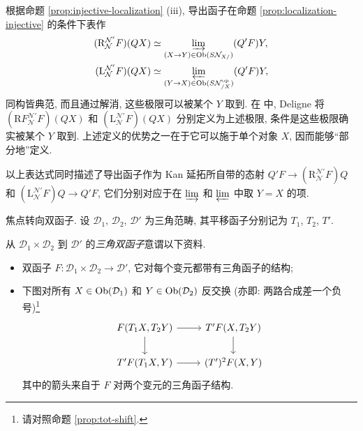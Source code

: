 \begin{remark}\label{rem:Deligne-derived-functor}
	根据命题 \ref{prop:injective-localization} (iii), 导出函子在命题 \ref{prop:localization-injective} 的条件下表作
	\begin{align*}
		(\mathrm{R}_{\mathcal{N}}^{\mathcal{N}'} F)(QX) & \simeq \varinjlim_{(X \to Y) \in \operatorname{Ob}(S\mathcal{N}_{X/})} (Q'F)Y, \\
		(\mathrm{L}_{\mathcal{N}}^{\mathcal{N}'} F)(QX) & \simeq \varprojlim_{(Y \to X) \in \operatorname{Ob}(S\mathcal{N}_{/X}^{\operatorname{op}})} (Q'F)Y,
	\end{align*}
	同构皆典范, 而且通过解消, 这些极限可以被某个 $Y$ 取到. 在 \cite[Exp XVII, Déf 1.2.1]{SGA4-3} 中, Deligne 将 $(\mathrm{R}F_{\mathcal{N}}^{\mathcal{N}'} F)(QX)$ 和 $(\mathrm{L}_{\mathcal{N}}^{\mathcal{N}'} F)(QX)$ 分别定义为上述极限, 条件是这些极限确实被某个 $Y$ 取到. 上述定义的优势之一在于它可以施于单个对象 $X$, 因而能够``部分地''定义.
	
	以上表达式同时描述了导出函子作为 Kan 延拓所自带的态射 $Q'F \to (\mathrm{R}^{\mathcal{N}'}_{\mathcal{N}} F)Q$ 和 $(\mathrm{L}^{\mathcal{N}'}_{\mathcal{N}} F)Q \to Q'F$, 它们分别对应于在 $\varinjlim$ 和 $\varprojlim$ 中取 $Y=X$ 的项.
\end{remark}

焦点转向双函子. 设 $\mathcal{D}_1$, $\mathcal{D}_2$, $\mathcal{D}'$ 为三角范畴, 其平移函子分别记为 $T_1$, $T_2$, $T'$.

\begin{definition}\label{def:triangulated-bifunctor}
	从 $\mathcal{D}_1 \times \mathcal{D}_2$ 到 $\mathcal{D}'$ 的\emph{三角双函子}意谓以下资料.
	\begin{itemize}
		\item 双函子 $F: \mathcal{D}_1 \times \mathcal{D}_2 \to \mathcal{D}'$, 它对每个变元都带有三角函子的结构;
		\item 下图对所有 $X \in \operatorname{Ob}(\mathcal{D}_1)$ 和 $Y \in \operatorname{Ob}(\mathcal{D}_2)$ 反交换 (亦即: 两路合成差一个负号)\footnote{请对照命题 \ref{prop:tot-shift}.}
		\[\begin{tikzcd}
			F(T_1 X, T_2 Y) \arrow[r] \arrow[d] & T' F(X, T_2 Y) \arrow[d] \\
			T' F(T_1 X, Y) \arrow[r] & (T')^2 F(X, Y)
		\end{tikzcd}\]
		其中的箭头来自于 $F$ 对两个变元的三角函子结构.
	\end{itemize}
\end{definition}


